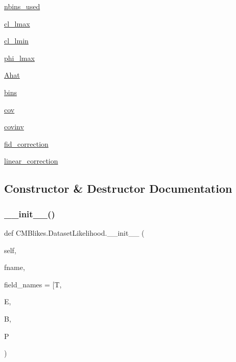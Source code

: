 \begin{DoxyCompactItemize}
\item 
\mbox{\hyperlink{classCMBlikes_1_1DatasetLikelihood_a50351977a5745d83815fa2ccada6decf}{nbins\+\_\+used}}
\item 
\mbox{\hyperlink{classCMBlikes_1_1DatasetLikelihood_a7aa0c43e48f8a2cb3f8c71997626f6d2}{cl\+\_\+lmax}}
\item 
\mbox{\hyperlink{classCMBlikes_1_1DatasetLikelihood_a12b1dfa8b99a74597a38508eb2ded635}{cl\+\_\+lmin}}
\item 
\mbox{\hyperlink{classCMBlikes_1_1DatasetLikelihood_a31c3e57fcc6e90862fc64a8d95f22dc4}{phi\+\_\+lmax}}
\item 
\mbox{\hyperlink{classCMBlikes_1_1DatasetLikelihood_a0dedde4f03a33eefca5eeb6e05c7859e}{Ahat}}
\item 
\mbox{\hyperlink{classCMBlikes_1_1DatasetLikelihood_a799d05ca08e557d08f2404123b7fcc1c}{bins}}
\item 
\mbox{\hyperlink{classCMBlikes_1_1DatasetLikelihood_a66d318de563401be5dcb1444dc1f0e7e}{cov}}
\item 
\mbox{\hyperlink{classCMBlikes_1_1DatasetLikelihood_a3f998ab9ee824d09f1f03c74a643a6bd}{covinv}}
\item 
\mbox{\hyperlink{classCMBlikes_1_1DatasetLikelihood_a2effb47262fc64fbcd79be7441b9492a}{fid\+\_\+correction}}
\item 
\mbox{\hyperlink{classCMBlikes_1_1DatasetLikelihood_a23b5591cfafaf47cb3818b96bdd58f29}{linear\+\_\+correction}}
\end{DoxyCompactItemize}


\subsection{Constructor \& Destructor Documentation}
\mbox{\label{classCMBlikes_1_1DatasetLikelihood_a441c826d7b251b0b8c4952227a50ec32}} 
\subsubsection{\texorpdfstring{\+\_\+\+\_\+init\+\_\+\+\_\+()}{\_\_init\_\_()}}
{\footnotesize\ttfamily def C\+M\+Blikes.\+Dataset\+Likelihood.\+\_\+\+\_\+init\+\_\+\+\_\+ (\begin{DoxyParamCaption}\item[{}]{self,  }\item[{}]{fname,  }\item[{}]{field\+\_\+names = {\ttfamily \mbox{[}\textquotesingle{}T\textquotesingle{}},  }\item[{}]{E,  }\item[{}]{B,  }\item[{}]{P }\end{DoxyParamCaption})}



